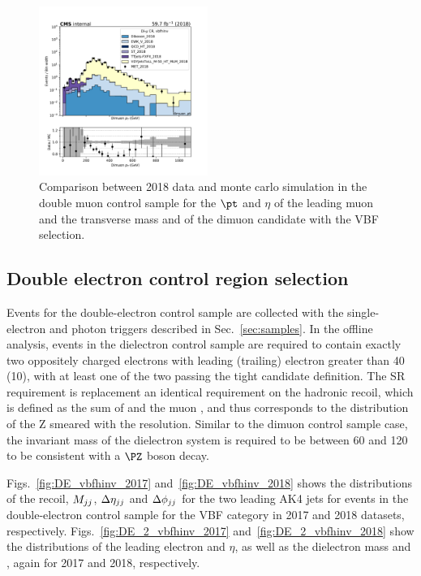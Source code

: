 \begin{figure}[htbp]
\begin{center}
        \includegraphics[width=0.49\textwidth]{fig/datamc/cr_2m_vbf/cr_2m_vbf_dimuon_pt_losf_2018.pdf}
    \end{center}
    \caption{Comparison between 2018 data and monte carlo simulation in the double muon control sample for
    the $\pt$ and $\eta$ of the leading muon and the transverse mass and \pt of the dimuon candidate with the VBF selection.}
    \label{fig:DM_2_vbfhinv_2018}
\end{figure}

\newpage

\subsection{Double electron control region selection}
\label{sec:selection_cr_2e}
Events for the double-electron control sample are collected with the single-electron and 
photon triggers described in Sec.~\ref{sec:samples}. In the offline analysis, events in the dielectron 
control sample are required to contain exactly two oppositely charged electrons with leading (trailing) 
electron \pt greater than 40 (10)\GeV, with at least one of the two passing the tight candidate definition. 
The SR \ptmiss requirement is replacement an identical requirement on the hadronic recoil, which is defined as the 
sum of \ptvecmiss and the muon \vpt, and thus corresponds to the distribution of the Z \pt smeared with the \ptmiss resolution. 
Similar to the dimuon control sample case, the invariant mass of the dielectron system is required to be between 60 and 120\GeV 
to be consistent with a $\PZ$ boson decay.

Figs.~\ref{fig:DE_vbfhinv_2017} and~\ref{fig:DE_vbfhinv_2018} shows the distributions of the recoil, $M_{jj}$, $\Delta \eta_{jj}$ and
$\Delta \phi_{jj}$ for the two leading AK4 jets for events in the double-electron control sample for the VBF category in 2017 and 
2018 datasets, respectively. 
Figs.~\ref{fig:DE_2_vbfhinv_2017} and~\ref{fig:DE_2_vbfhinv_2018} show the distributions of the leading electron \pt and $\eta$, 
as well as the dielectron mass and \pt, again for 2017 and 2018, respectively.

